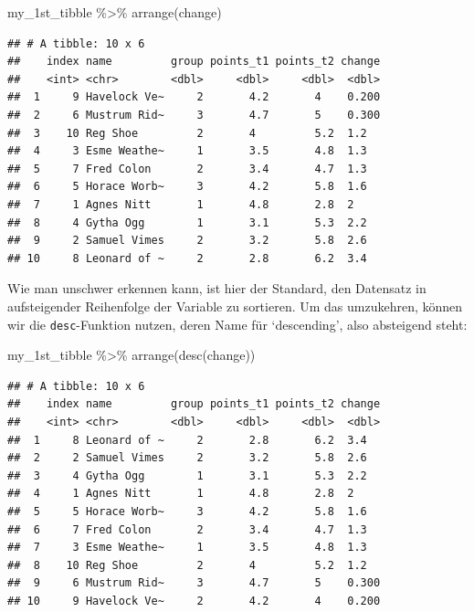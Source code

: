 \documentclass[
]{book}
\newenvironment{Shaded}{\begin{snugshade}}{\end{snugshade}}
\newcommand{\FunctionTok}[1]{\textcolor[rgb]{0.00,0.00,0.00}{#1}}
\newcommand{\NormalTok}[1]{#1}
\newcommand{\SpecialCharTok}[1]{\textcolor[rgb]{0.00,0.00,0.00}{#1}}
\begin{document}
\begin{Shaded}
\begin{Highlighting}[]
\NormalTok{my\_1st\_tibble }\SpecialCharTok{\%\textgreater{}\%} 
  \FunctionTok{arrange}\NormalTok{(change)}
\end{Highlighting}
\end{Shaded}

\begin{verbatim}
## # A tibble: 10 x 6
##    index name         group points_t1 points_t2 change
##    <int> <chr>        <dbl>     <dbl>     <dbl>  <dbl>
##  1     9 Havelock Ve~     2       4.2       4    0.200
##  2     6 Mustrum Rid~     3       4.7       5    0.300
##  3    10 Reg Shoe         2       4         5.2  1.2  
##  4     3 Esme Weathe~     1       3.5       4.8  1.3  
##  5     7 Fred Colon       2       3.4       4.7  1.3  
##  6     5 Horace Worb~     3       4.2       5.8  1.6  
##  7     1 Agnes Nitt       1       4.8       2.8  2    
##  8     4 Gytha Ogg        1       3.1       5.3  2.2  
##  9     2 Samuel Vimes     2       3.2       5.8  2.6  
## 10     8 Leonard of ~     2       2.8       6.2  3.4
\end{verbatim}

Wie man unschwer erkennen kann, ist hier der Standard, den Datensatz in aufsteigender Reihenfolge der Variable zu sortieren. Um das umzukehren, können wir die \texttt{desc}-Funktion nutzen, deren Name für `descending', also absteigend steht:

\begin{Shaded}
\begin{Highlighting}[]
\NormalTok{my\_1st\_tibble }\SpecialCharTok{\%\textgreater{}\%} 
  \FunctionTok{arrange}\NormalTok{(}\FunctionTok{desc}\NormalTok{(change))}
\end{Highlighting}
\end{Shaded}

\begin{verbatim}
## # A tibble: 10 x 6
##    index name         group points_t1 points_t2 change
##    <int> <chr>        <dbl>     <dbl>     <dbl>  <dbl>
##  1     8 Leonard of ~     2       2.8       6.2  3.4  
##  2     2 Samuel Vimes     2       3.2       5.8  2.6  
##  3     4 Gytha Ogg        1       3.1       5.3  2.2  
##  4     1 Agnes Nitt       1       4.8       2.8  2    
##  5     5 Horace Worb~     3       4.2       5.8  1.6  
##  6     7 Fred Colon       2       3.4       4.7  1.3  
##  7     3 Esme Weathe~     1       3.5       4.8  1.3  
##  8    10 Reg Shoe         2       4         5.2  1.2  
##  9     6 Mustrum Rid~     3       4.7       5    0.300
## 10     9 Havelock Ve~     2       4.2       4    0.200
\end{verbatim}
\end{document}
